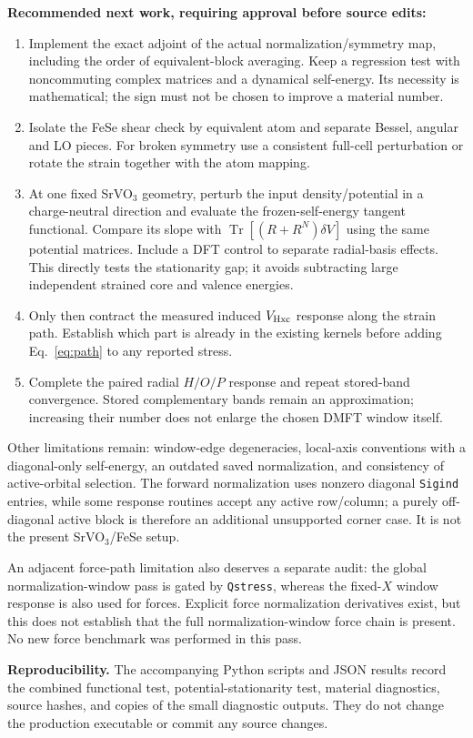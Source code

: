 \documentclass[11pt]{article}
\newcommand{\Tr}{\operatorname{Tr}}
\begin{document}
\textbf{Recommended next work, requiring approval before source edits:}
\begin{enumerate}
\item Implement the exact adjoint of the actual normalization/symmetry map,
including the order of equivalent-block averaging. Keep a regression test
with noncommuting complex matrices and a dynamical self-energy. Its necessity
is mathematical; the sign must not be chosen to improve a material number.
\item Isolate the FeSe shear check by equivalent atom and separate Bessel,
angular and LO pieces. For broken symmetry use a consistent full-cell
perturbation or rotate the strain together with the atom mapping.
\item At one fixed SrVO$_3$ geometry, perturb the input density/potential in
a charge-neutral direction and evaluate the frozen-self-energy tangent
functional. Compare its slope with $\Tr[(R+R^N)\delta V]$ using the same
potential matrices. Include a DFT control to separate radial-basis effects.
This directly tests the stationarity gap; it avoids subtracting large
independent strained core and valence energies.
\item Only then contract the measured induced $V_{\rm Hxc}$ response along
the strain path. Establish which part is already in the existing kernels
before adding Eq.~\eqref{eq:path} to any reported stress.
\item Complete the paired radial $H/O/P$ response and repeat stored-band
convergence. Stored complementary bands remain an approximation; increasing
their number does not enlarge the chosen DMFT window itself.
\end{enumerate}
Other limitations remain: window-edge degeneracies, local-axis conventions
with a diagonal-only self-energy, an outdated saved normalization, and
consistency of active-orbital selection. The forward normalization uses
nonzero diagonal \texttt{Sigind} entries, while some response routines accept
any active row/column; a purely off-diagonal active block is therefore an
additional unsupported corner case. It is not the present SrVO$_3$/FeSe setup.

An adjacent force-path limitation also deserves a separate audit: the
global normalization-window pass is gated by \texttt{Qstress}, whereas the
fixed-$X$ window response is also used for forces. Explicit force
normalization derivatives exist, but this does not establish that the full
normalization-window force chain is present. No new force benchmark was
performed in this pass.

\textbf{Reproducibility.} The accompanying Python scripts and JSON results
record the combined functional test, potential-stationarity test, material
diagnostics, source hashes, and copies of the small diagnostic outputs.
They do not change the production executable or commit any source changes.
\end{document}
